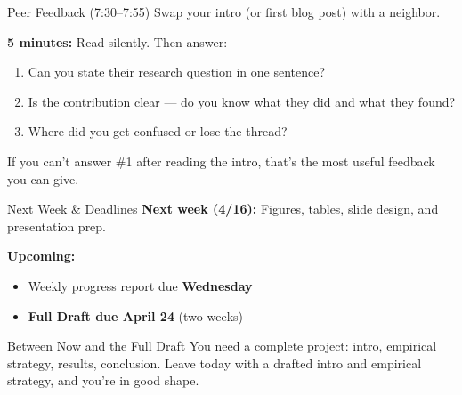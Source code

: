 \begin{frame}{Peer Feedback (7:30--7:55)}
  Swap your intro (or first blog post) with a neighbor.

  \vspace{8pt}

  \textbf{5 minutes:} Read silently. Then answer:

  \vspace{4pt}

  \begin{enumerate}
    \item Can you state their research question in one sentence?
    \item Is the contribution clear --- do you know what they did and what they found?
    \item Where did you get confused or lose the thread?
  \end{enumerate}

  \vspace{8pt}

  If you can't answer \#1 after reading the intro, that's the most useful feedback you can give.
\end{frame}

\begin{frame}{Next Week \& Deadlines}
  \textbf{Next week (4/16):} Figures, tables, slide design, and presentation prep.

  \vspace{10pt}

  \textbf{Upcoming:}
  \begin{itemize}
    \item Weekly progress report due \textbf{Wednesday}
    \item \textbf{\textcolor{usfgreen}{Full Draft due April 24}} (two weeks)
  \end{itemize}

  \vspace{10pt}

  \begin{block}{Between Now and the Full Draft}
    You need a complete project: intro, empirical strategy, results, conclusion. Leave today with a drafted intro and empirical strategy, and you're in good shape.
  \end{block}
\end{frame}


